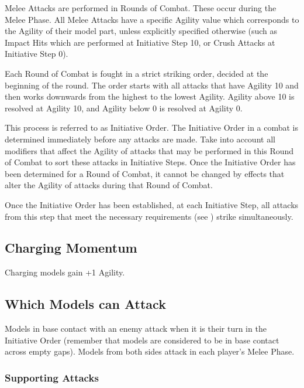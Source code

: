 Melee Attacks are performed in Rounds of Combat. These occur during the Melee Phase. All Melee Attacks have a specific Agility value which corresponds to the Agility of their model part, unless explicitly specified otherwise (such as Impact Hits which are performed at Initiative Step 10, or Crush Attacks at Initiative Step 0). 
\par
Each Round of Combat is fought in a strict striking order, decided at the beginning of the round. The order starts with all attacks that have Agility 10 and then works downwards from the highest to the lowest Agility. Agility above 10 is resolved at Agility 10, and Agility below 0 is resolved at Agility 0.
\par
This process is referred to as Initiative Order. The Initiative Order in a combat is determined immediately before any attacks are made. Take into account all modifiers that affect the Agility of attacks that may be performed in this Round of Combat to sort these attacks in Initiative Steps. Once the Initiative Order has been determined for a Round of Combat, it cannot be changed by effects that alter the Agility of attacks during that Round of Combat.
\par
Once the Initiative Order has been established, at each Initiative Step, all attacks from this step that meet the necessary requirements (see ) strike simultaneously.

\subsection{Charging Momentum}
\label{charging_momentum}

Charging models gain +1 Agility.

\subsection{Which Models can Attack}
\label{which_models_can_attack}

Models in base contact with an enemy attack when it is their turn in the Initiative Order (remember that models are considered to be in base contact across empty gaps). Models from both sides attack in each player's Melee Phase.

\subsubsection{Supporting Attacks}
\label{supporting_attacks}

